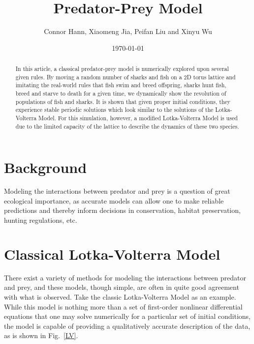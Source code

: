 \documentclass[aps,prl,preprint,superscriptaddress]{revtex4}
\begin{document}
	
	
	\title{Predator-Prey Model}%
	
	\author{Connor Hann, Xiaomeng Jia, Peifan Liu and Xinyu Wu}
	
	
	\date{\today}
	
	\begin{abstract}
	In this article, a classical predator-prey model is numerically explored upon several given rules. By moving a random number of sharks and fish on a 2D torus lattice and imitating the real-world rules that fish swim and breed offspring, sharks hunt fish, breed and starve to death for a given time, we dynamically show the revolution of populations of fish and sharks. It is shown that given proper initial conditions, they experience stable periodic solutions which look similar to the solutions of the Lotka-Volterra Model. For this simulation, however, a modified Lotka-Volterra Model is used due to the limited capacity of the lattice to describe the dynamics of these two species.
	\end{abstract}
	
	\maketitle
	
	
	
	\section{Background} 
Modeling the interactions between predator and prey is a question of great ecological importance, as accurate models can allow one to make reliable predictions and thereby inform decisions in conservation, habitat preservation, hunting regulations, etc. 
\section{Classical Lotka-Volterra Model}	
There exist a variety of methods for modeling the interactions between predator and prey, and these models, though simple, are often in quite good agreement with what is observed. Take the classic Lotka-Volterra Model as an example. While this model is nothing more than a set of first-order nonlinear differential equations that one may solve numerically for a particular set of initial conditions, the model is capable of providing a qualitatively accurate description of the data, as is shown in Fig.~\ref{LV}. 
\end{document}
